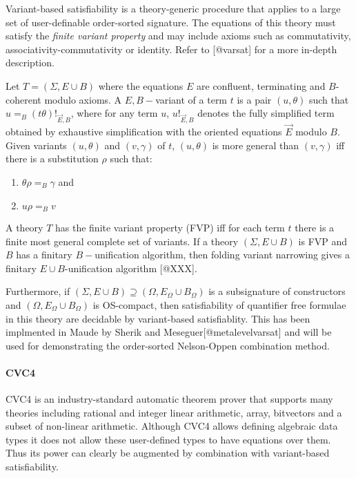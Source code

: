 \documentclass[]{article}
\providecommand{\tightlist}{%
  \setlength{\itemsep}{0pt}\setlength{\parskip}{0pt}}
\let\oldparagraph\paragraph
\renewcommand{\paragraph}[1]{\oldparagraph{#1}\mbox{}}
\newcommand \union      {\cup }
\begin{document}
Variant-based satisfiability is a theory-generic procedure that applies
to a large set of user-definable order-sorted signature. The equations
of this theory must satisfy the \emph{finite variant property} and may
include axioms such as commutativity, associativity-commutativity or
identity. Refer to {[}@varsat{]} for a more in-depth description.

Let \(T = (\Sigma, E \union B)\) where the equations \(E\) are
confluent, terminating and \(B\)-coherent modulo axioms. A
\(E,B-\)variant of a term \(t\) is a pair \((u, \theta)\) such that
\(u =_B (t\theta)!_{\vec E,B}\), where for any term \(u\),
\(u!_{\vec E, B}\) denotes the fully simplified term obtained by
exhaustive simplification with the oriented equations \(\vec E\) modulo
\(B\). Given variants \((u, \theta)\) and \((v, \gamma)\) of \(t\),
\((u, \theta)\) is more general than \((v, \gamma)\) iff there is a
substitution \(\rho\) such that:

\begin{enumerate}
\def\labelenumi{\arabic{enumi}.}
\tightlist
\item
  \(\theta\rho =_B \gamma\) and
\item
  \(u\rho =_B v\)
\end{enumerate}

A theory \(T\) has the finite variant property (FVP) iff for each term
\(t\) there is a finite most general complete set of variants. If a
theory \((\Sigma, E\union B)\) is FVP and \(B\) has a finitary
\(B-\)unification algorithm, then folding variant narrowing gives a
finitary \(E\union B\)-unification algorithm {[}@XXX{]}.

Furthermore, if
\((\Sigma, E \union B) \supseteq (\Omega, E_{\Omega} \union B_\Omega)\)
is a subsignature of constructors and
\((\Omega, E_{\Omega} \union B_\Omega)\) is OS-compact, then
satisfiability of quantifier free formulae in this theory are decidable
by variant-based satisfiablity. This has been implmented in Maude by
Sherik and Meseguer{[}@metalevelvarsat{]} and will be used for
demonstrating the order-sorted Nelson-Oppen combination method.

\hypertarget{cvc4}{%
\paragraph{CVC4}\label{cvc4}}

CVC4 is an industry-standard automatic theorem prover that supports many
theories including rational and integer linear arithmetic, array,
bitvectors and a subset of non-linear arithmetic. Although CVC4 allows
defining algebraic data types it does not allow these user-defined types
to have equations over them. Thus its power can clearly be augmented by
combination with variant-based satisfiability.
\end{document}
